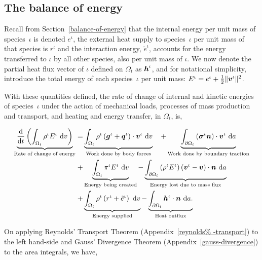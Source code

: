 \subsection{The balance of energy}
\label{eu-balance-of-energy}

Recall from Section~\ref{balance-of-energy} that the internal energy
per unit mass of species~$\iota$ is denoted $e^\iota$, the external
heat supply to species~$\iota$ per unit mass of that species is
$r^\iota$ and the interaction energy, $\tilde{e}^\iota$, accounts for
the energy transferred to $\iota$ by all other species, also per unit
mass of $\iota$. We now denote the partial heat flux vector of $\iota$
defined on $\Omega_{t}$ as $\mbox{\boldmath$ h$}^\iota$, and for notational simplicity,
introduce the total energy of each species~$\iota$ per unit mass:
$E^{\iota} = e^\iota + \frac{1}{2} \Vert\mbox{\boldmath$ v$}^\iota\Vert^2$.

With these quantities defined, the rate of change of internal and
kinetic energies of species~$\iota$ under the action of mechanical
loads, processes of mass production and transport, and heating and
energy transfer, in $\Omega_{t}$, is,

\begin{equation}
\begin{split}
\underbrace{\frac{\mathrm{d}}{\mathrm{d}t}\left(\int_{\Omega_{t}}
  \rho^{\iota} E^{\iota}\ \mathrm{d}v \right)}_{\text{Rate of change
    of energy}} = & \underbrace{\int_{\Omega_{t}} \rho^{\iota}
  \left(\mbox{\boldmath$ g$}^{\iota} +
  \mbox{\boldmath$ q$}^{\iota}\right)\cdot\mbox{\boldmath$ v$}^{\iota}\ \mathrm{d}v}_{\text{Work done by
    body forces}}\quad + \underbrace{\int_{\partial \Omega_{t}}
  \left(\mbox{\boldmath$\sigma$}^{\iota}\mbox{\boldmath$ n$}\right)
  \cdot\mbox{\boldmath$ v$}^{\iota}\ \mathrm{d}a}_{\text{Work done by boundary
    traction}}\\ + & \underbrace{\int_{\Omega_{t}}
  \pi^{\iota}E^{\iota}\ \mathrm{d}v}_{\text{Energy being created}} -
\underbrace{\int_{\partial \Omega_{t}} \left(\rho^{\iota} E^{\iota}
  \right) \left(\mbox{\boldmath$ v$}^{\iota} - \mbox{\boldmath$ v$}\right) \cdot
  \mbox{\boldmath$ n$}\ \mathrm{d}a}_{\text{Energy lost due to mass flux}} \\ +
&\underbrace{\int_{\Omega_{t}} \rho^{\iota} \left(r^{\iota} +
  \tilde{e}^{\iota} \right)\ \mathrm{d}v}_{\text{Energy supplied}} -
\underbrace{\int_{\partial \Omega_{t}}
  \mbox{\boldmath$ h$}^{\iota}\cdot\mbox{\boldmath$ n$}\ \mathrm{d}a.}_{\text{Heat outflux}}
\end{split}
\label{eu-globalbalanceofenergy}
\end{equation}

On applying Reynolds' Transport Theorem (Appendix~\ref{reynolds%
  -transport}) to the left hand-side and Gauss' Divergence Theorem
(Appendix~\ref{gauss-divergence}) to the area integrals, we have,

